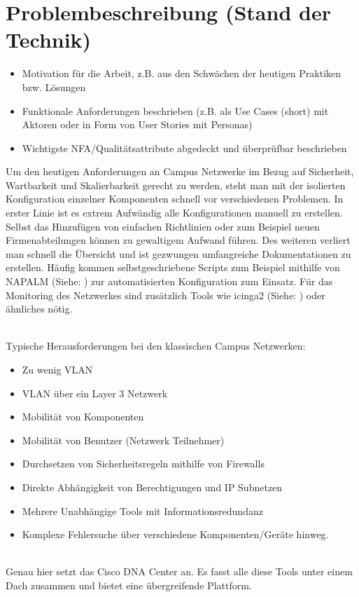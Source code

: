 \section{Problembeschreibung (Stand der Technik)}

\begin{itemize}	
	\item Motivation für die Arbeit, z.B. aus den Schwächen der heutigen Praktiken bzw. Lösungen
	\item Funktionale Anforderungen beschrieben (z.B. als Use Cases (short) mit Aktoren oder in Form von User Stories mit Personas)
	\item Wichtigste NFA/Qualitätsattribute abgedeckt und überprüfbar beschrieben
\end{itemize}

Um den heutigen Anforderungen an Campus Netzwerke im Bezug auf Sicherheit, Wartbarkeit und Skalierbarkeit gerecht zu werden, steht man mit der isolierten Konfiguration einzelner Komponenten schnell vor verschiedenen Problemen. In erster Linie ist es extrem Aufwändig alle Konfigurationen manuell zu erstellen. Selbst das Hinzufügen von einfachen Richtlinien oder zum Beispiel neuen Firmenabteilungen können zu gewaltigem Aufwand führen. Des weiteren verliert man schnell die Übersicht und ist gezwungen umfangreiche Dokumentationen zu erstellen. Häufig kommen selbstgeschriebene Scripts zum Beispiel mithilfe von NAPALM (Siehe: \cite{napalm}) zur automatisierten Konfiguration zum Einsatz. Für das Monitoring des Netzwerkes sind zusätzlich Tools wie icinga2  (Siehe: \cite{icinga2}) oder ähnliches nötig. 

~\\
Typische Herausforderungen bei den klassischen Campus Netzwerken:
\begin{itemize}
	\item Zu wenig VLAN
	\item VLAN über ein Layer 3 Netzwerk
	\item Mobilität von Komponenten
	\item Mobilität von Benutzer (Netzwerk Teilnehmer)
	\item Durchsetzen von Sicherheitsregeln mithilfe von Firewalls
	\item Direkte Abhängigkeit von Berechtigungen und IP Subnetzen
	\item Mehrere Unabhängige Tools mit Informationsredundanz
	\item Komplexe Fehlersuche über verschiedene Komponenten/Geräte hinweg.
\end{itemize}

~\\
Genau hier setzt das Cisco DNA Center an. Es fasst alle diese Tools unter einem Dach zusammen und bietet eine übergreifende Plattform. 


